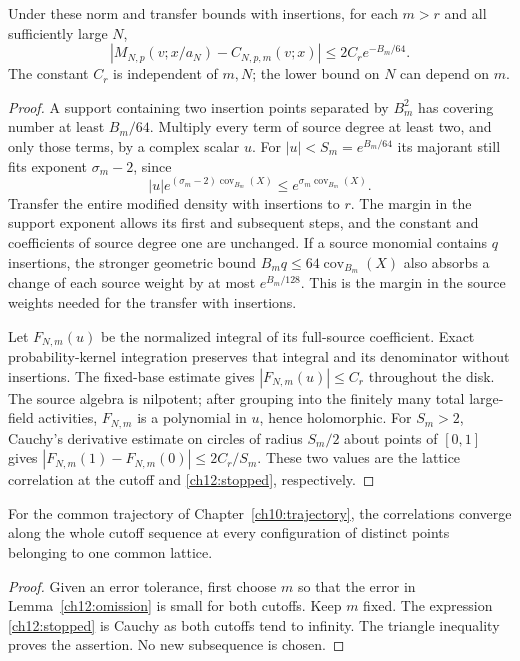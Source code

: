 \begin{lemma}
\label{ch12:omission}
Under these norm and transfer bounds with insertions, for each $m>r$ and all
sufficiently large $N$,
\[
 |M_{N,p}(v;x/a_N)-C_{N,p,m}(v;x)|
       \le 2C_r e^{-B_m/64}.
\]
The constant $C_r$ is independent of $m,N$; the lower bound on $N$ can
depend on $m$.
\end{lemma}
\begin{proof}
A support containing two insertion points separated by $B_m^2$ has covering
number at least $B_m/64$. Multiply every term of source degree at least two, and only those
terms, by a complex scalar $u$. For $|u|<S_m=e^{B_m/64}$ its
majorant still fits exponent $\sigma_m-2$, since
\[
 |u|e^{(\sigma_m-2)\operatorname{cov}_{B_m}(X)}
       \le e^{\sigma_m\operatorname{cov}_{B_m}(X)}.
\]
Transfer the entire modified density with insertions to $r$. The margin in the support
exponent allows its first and subsequent steps, and the constant and
coefficients of source degree one are unchanged. If a source monomial contains $q$ insertions,
the stronger geometric bound $B_mq\le64\operatorname{cov}_{B_m}(X)$
also absorbs a change of each source weight by at most $e^{B_m/128}$.
This is the margin in the source weights needed for the transfer with insertions.

Let $F_{N,m}(u)$ be the normalized integral of its full-source
coefficient. Exact probability-kernel integration preserves that
integral and its denominator without insertions. The fixed-base estimate gives
$|F_{N,m}(u)|\le C_r$ throughout the disk. The source algebra is
nilpotent; after grouping into the finitely many total large-field activities,
$F_{N,m}$ is a polynomial in $u$, hence holomorphic. For $S_m>2$,
Cauchy's derivative estimate on circles of radius $S_m/2$ about points
of $[0,1]$ gives
$|F_{N,m}(1)-F_{N,m}(0)|\le2C_r/S_m$. These two values are the
lattice correlation at the cutoff and \eqref{ch12:stopped}, respectively.
\end{proof}

\begin{proposition}
\label{ch12:dense-cauchy}
For the common trajectory of Chapter~\ref{ch10:trajectory}, the correlations converge along the whole cutoff sequence at every
configuration of distinct points belonging to one common lattice.
\end{proposition}
\begin{proof}
Given an error tolerance, first choose $m$ so that the
error in Lemma~\ref{ch12:omission} is small for both cutoffs. Keep $m$ fixed. The
expression \eqref{ch12:stopped} is Cauchy as both cutoffs tend
to infinity. The triangle inequality proves the assertion. No new
subsequence is chosen.
\end{proof}

